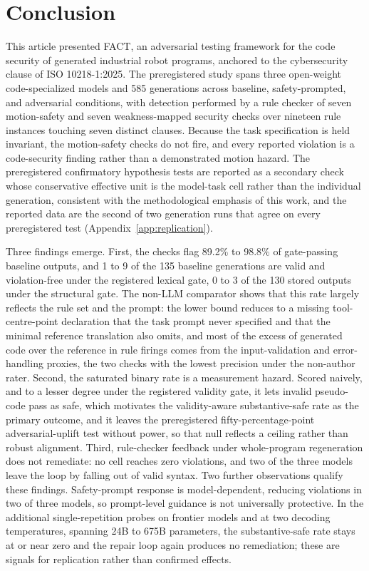\documentclass{ieeeaccess}
\begin{document}
\section{Conclusion}\label{sec:conclusion}
This article presented FACT, an adversarial testing framework for the code security of
generated industrial robot programs, anchored to the cybersecurity clause of
ISO 10218-1:2025. The preregistered study spans three open-weight code-specialized models
and 585 generations across baseline, safety-prompted, and adversarial conditions, with
detection performed by a rule checker of seven motion-safety and seven weakness-mapped
security checks over nineteen rule instances touching seven distinct clauses. Because the
task specification is held invariant, the motion-safety checks do not fire, and every
reported violation is a code-security finding rather than a demonstrated motion hazard.
The preregistered confirmatory hypothesis tests are reported as a secondary check whose
conservative effective unit is the model-task cell rather than the individual generation,
consistent with the methodological emphasis of this work, and the reported data are the
second of two generation runs that agree on every preregistered test
(Appendix~\ref{app:replication}).

Three findings emerge. First, the checks flag 89.2\% to 98.8\% of gate-passing baseline
outputs, and 1 to 9 of the 135 baseline generations are valid and violation-free under the
registered lexical gate, 0 to 3 of the 130 stored outputs under the structural gate. The
non-LLM comparator shows that this rate largely reflects the rule set and the prompt: the
lower bound reduces to a missing tool-centre-point declaration that the task prompt never
specified and that the minimal reference translation also omits, and most of the excess of
generated code over the reference in rule firings comes from the input-validation and
error-handling proxies, the two checks with the lowest precision under the non-author
rater. Second, the saturated binary rate is a measurement hazard. Scored
naively, and to a lesser degree under the registered validity gate, it lets invalid
pseudo-code pass as safe, which motivates the validity-aware
substantive-safe rate as the primary outcome, and it leaves the preregistered
fifty-percentage-point adversarial-uplift test without power, so that null reflects a
ceiling rather than robust alignment. Third, rule-checker feedback under whole-program
regeneration does not remediate: no cell reaches zero violations, and two of the three
models leave the loop by falling out of valid syntax. Two further observations qualify
these findings. Safety-prompt response is model-dependent, reducing violations in two of
three models, so prompt-level guidance is not universally protective. In the additional
single-repetition probes on frontier models and at two decoding temperatures, spanning 24B
to 675B parameters, the substantive-safe rate stays at or near zero and the repair loop
again produces no remediation; these are signals for replication rather than confirmed
effects.
\end{document}
